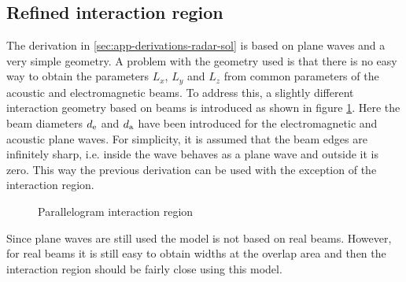 \documentclass[11pt,twoside]{eitExjobb}
\begin{document}
	\subsection{Refined interaction region} \label{sec:app-derivations-radar-refined}
	The derivation in \ref{sec:app-derivations-radar-sol} is based on plane waves and a very simple geometry. A problem with the geometry used is that there is no easy way to obtain the parameters $L_{x}$, $L_{y}$ and $L_{z}$ from common parameters of the acoustic and electromagnetic beams. To address this, a slightly different interaction geometry based on beams is introduced as shown in figure \ref{fig:parallelogram}. Here the beam diameters $d_{\mathrm{e}}$ and $d_{\mathrm{a}}$ have been introduced for the electromagnetic and acoustic plane waves. For simplicity, it is assumed that the beam edges are infinitely sharp, i.e. inside the wave behaves as a plane wave and outside it is zero. This way the previous derivation can be used with the exception of the interaction region.
	\begin{figure}[h]
		\centering
		\resizebox{\textwidth}{!}{
			
		}
		\caption{\label{fig:parallelogram} Parallelogram interaction region}
	\end{figure}
	Since plane waves are still used the model is not based on real beams. However, for real beams it is still easy to obtain widths at the overlap area and then the interaction region should be fairly close using this model.
	
\end{document}
